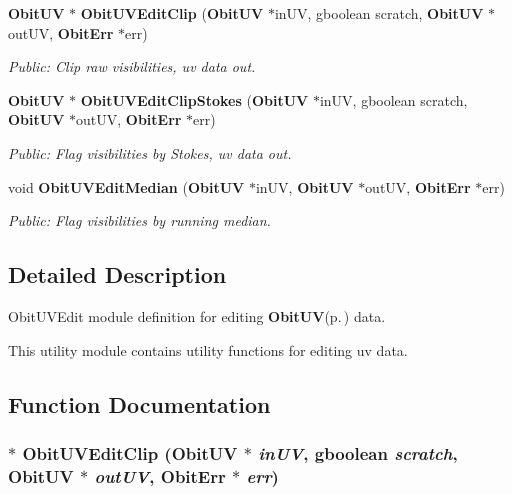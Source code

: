 \begin{CompactItemize}
{\bf Obit\-UV} $\ast$ {\bf Obit\-UVEdit\-Clip} ({\bf Obit\-UV} $\ast$in\-UV, gboolean scratch, {\bf Obit\-UV} $\ast$out\-UV, {\bf Obit\-Err} $\ast$err)
\begin{CompactList}\small\item\em Public: Clip raw visibilities, uv data out. \item\end{CompactList}\item 
{\bf Obit\-UV} $\ast$ {\bf Obit\-UVEdit\-Clip\-Stokes} ({\bf Obit\-UV} $\ast$in\-UV, gboolean scratch, {\bf Obit\-UV} $\ast$out\-UV, {\bf Obit\-Err} $\ast$err)
\begin{CompactList}\small\item\em Public: Flag visibilities by Stokes, uv data out. \item\end{CompactList}\item 
void {\bf Obit\-UVEdit\-Median} ({\bf Obit\-UV} $\ast$in\-UV, {\bf Obit\-UV} $\ast$out\-UV, {\bf Obit\-Err} $\ast$err)
\begin{CompactList}\small\item\em Public: Flag visibilities by running median. \item\end{CompactList}\end{CompactItemize}


\subsection{Detailed Description}
Obit\-UVEdit module definition for editing {\bf Obit\-UV}{\rm (p.\,\pageref{structObitUV})} data. 

This utility module contains utility functions for editing uv data.

\subsection{Function Documentation}
\subsubsection{$\ast$ Obit\-UVEdit\-Clip ({\bf Obit\-UV} $\ast$ {\em in\-UV}, gboolean {\em scratch}, {\bf Obit\-UV} $\ast$ {\em out\-UV}, {\bf Obit\-Err} $\ast$ {\em err})}\label{ObitUVEdit_8h_a4}


